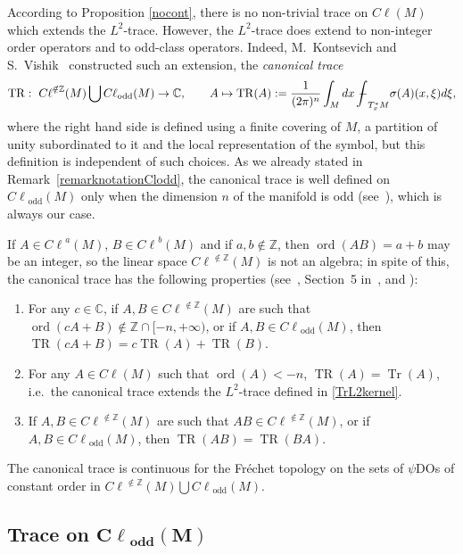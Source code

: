 \documentclass[11pt]{article}
\DeclareMathOperator{\TR}{TR} \DeclareMathOperator{\Op}{Op}
\DeclareMathOperator{\Tr}{Tr} \DeclareMathOperator{\ord}{ord}
\DeclareMathOperator{\odd}{odd} \DeclareMathOperator{\supp}{supp}
\newcommand{\Z}{{\mathbb Z}}
\def \Cl {{C\ell}}
\begin{document}
According to Proposition \ref{nocont}, there is no non-trivial trace on $\Cl(M)$ which extends the $L^2$-trace. However, the $L^2$-trace does extend to non-integer order operators and to odd-class operators. Indeed, M.~Kontsevich and S.~Vishik~\cite{kontsevichdeterminant} constructed such an extension, the \emph{canonical trace}
\begin{gather*}
\TR: \ \Cl^{\notin\Z}(M)\bigcup\Cl_{\odd}(M) \to\mathbb{C},\qquad
 A  \mapsto\TR(A):=\dfrac{1}{(2\pi)^n}\int_Mdx\ {-\hskip -11,5pt\int}_{T_x^{*}M}\sigma(A)(x,\xi)d\xi,
\end{gather*}
where the right hand side is def\/ined using a f\/inite covering of $M$, a partition of unity subordinated to it and the local representation of the symbol, but this def\/inition is independent of such choices. As we already stated in Remark~\ref{remarknotationClodd}, the canonical trace is well def\/ined on $\Cl_{\odd}(M)$ only when the dimension $n$ of the manifold is odd (see~\cite{grubb,lesch}), which is always our case.

 If $A\in \Cl^{a}(M)$, $B\in \Cl^b(M)$ and if $a,b\notin\Z$, then $\ord(AB)=a+b$ may be an integer, so the linear space $\Cl^{\notin\Z}(M)$ is not an algebra; in spite of this, the canonical trace has the following properties (see~\cite{kontsevichdeterminant}, Section~5 in~\cite{lesch}, and \cite{ouedraogo,sylvie,scott}):
 \begin{enumerate}\itemsep=0pt
\item For any $c\in\mathbb{C}$, if $A,B\in\Cl^{\notin\Z}(M)$ are such that $\ord(c A+B)\notin\Z\cap[-n,+\infty)$, or if $A,B\in\Cl_{\odd}(M)$, then $\TR(c A+B)=c\TR(A)+\TR(B)$.
\item For any $A\in\Cl(M)$ such that $\ord(A)<-n$, $\TR(A)=\Tr(A)$, i.e.\ the canonical trace extends the $L^2$-trace def\/ined in \eqref{TrL2kernel}.
\item If $A,B\in\Cl^{\notin\Z}(M)$ are such that $AB\in\Cl^{\notin\Z}(M)$, or if $A,B\in\Cl_{\odd}(M)$, then $\TR(AB)=\TR(BA)$.
\end{enumerate}

The canonical trace is continuous for the Fr\'echet topology on the sets of $\psi$DOs of constant order in $\Cl^{\notin\Z}(M)\bigcup\Cl_{\odd}(M)$.

\setcounter{section}{3}
\setcounter{subsection}{1}
\setcounter{subsubsection}{3}
\setcounter{equation}{12}
\subsection[Trace on $\Cl_{\odd}(M)$]{Trace on $\boldsymbol{\Cl_{\odd}(M)}$}
\end{document}
